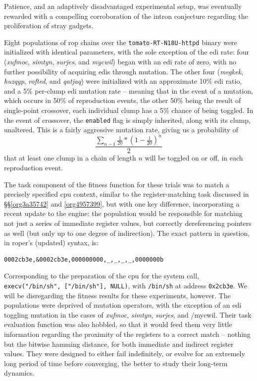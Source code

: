 \documentclass[12pt,glossary]{dalthesis}
\begin{document}
Patience, and an adaptively disadvantaged experimental setup, was eventually
rewarded with a compelling corroboration of the intron conjecture regarding
the proliferation of stray gadgets. 

Eight populations of \gls{rop} chains over the \texttt{tomato-RT-N18U-httpd} binary were
initialized with identical parameters, with the sole exception of the \gls{edi}
rate: four (\emph{xufmoc}, \emph{simtyn}, \emph{surjes}, and \emph{mycwil}) began with an \gls{edi}
rate of zero, with no further possibility of acquiring \glspl{edi} through
mutation. The other four (\emph{megkek}, \emph{huzqyp}, \emph{rofted}, and \emph{qatjaq}) were
initialized with an approximate 10\% \gls{edi} ratio, and a 5\% per-clump \gls{edi}
mutation rate -- meaning that in the event of a mutation, which occurs in 50\% of
reproduction events, the other 50\% being the result of single-point crossover,
each individual clump has a 5\% chance of being toggled. In the event of
crossover, the \texttt{enabled} flag is simply inherited, along with its clump,
unaltered. This is a fairly aggressive mutation rate, giving us a probability of
$$ \frac{\sum_{n-1} \frac{1}{20} * (1 - \frac{1}{20})^n}{2} $$ that at least one
clump in a chain of length \(n\) will be toggled on or off, in each reproduction
event.

The task component of the fitness function for these trials was to match a
precisely specified \gls{cpu} context, similar to the register-matching task
discussed in \S\S \ref{org3a35742} and \ref{org4957399}, but
with one key difference, incorporating a recent update to the engine: the
population would be responsible for matching not just a series of immediate
register values, but correctly dereferencing pointers as well (but only up to
one degree of indirection). The exact
pattern in question, in \gls{roper}'s (updated) syntax, is:
\begin{verbatim}
0002cb3e,&0002cb3e,000000000,_,_,_,_,0000000b
\end{verbatim}
Corresponding to the preparation of the \gls{cpu} for the system call,
\texttt{execv("/bin/sh", ["/bin/sh"], NULL)}, with \texttt{/bin/sh} at address
\texttt{0x2cb3e}. We will be disregarding the fitness results for these experiments,
however. The populations were deprived of mutation operators, with the exception
of an \gls{edi} toggling mutation in the cases of \emph{xufmoc}, \emph{simtyn}, \emph{surjes}, and
/mycwil. Their task evaluation function was also hobbled, so that it would feed
them very little information regarding the proximity of the registers to a correct match -- nothing but the bitwise hamming distance, for both immediate and indirect register
values. They were designed to either fail indefinitely, or evolve for an extremely
long period of time before converging, the better to study their long-term
dynamics. 
\end{document}
